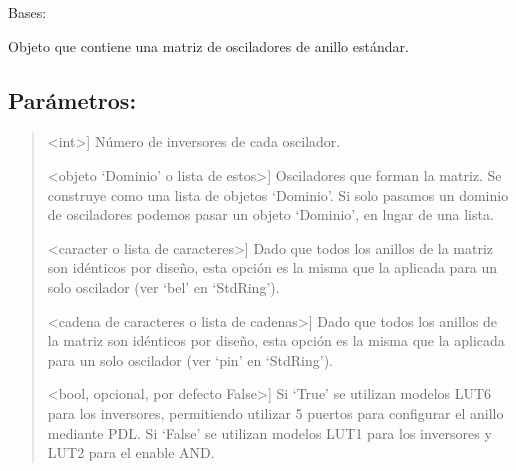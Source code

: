 \documentclass[letterpaper,10pt,english]{sphinxmanual}
\begin{document}
\begin{fulllineitems}
\label{\detokenize{myfpga:myfpga.ring_osc.StdMatrix}}
\pysigstartsignatures
{}
\pysigstopsignatures
\sphinxAtStartPar
Bases: 

\sphinxAtStartPar
Objeto que contiene una matriz de osciladores de anillo estándar.


\subsection{Parámetros:}
\label{\detokenize{myfpga:id3}}\begin{quote}
\begin{description}
\sphinxlineitem{N\_inv}{[}\textless{}int\textgreater{}{]}
\sphinxAtStartPar
Número de inversores de cada oscilador.

\sphinxlineitem{dominios}{[}\textless{}objeto ‘Dominio’ o lista de estos\textgreater{}{]}
\sphinxAtStartPar
Osciladores que forman la matriz. Se construye como una lista de 
objetos ‘Dominio’. Si solo pasamos un dominio de osciladores podemos
pasar un objeto ‘Dominio’, en lugar de una lista.

\sphinxlineitem{bel}{[}\textless{}caracter o lista de caracteres\textgreater{}{]}
\sphinxAtStartPar
Dado que todos los anillos de la matriz son idénticos 
por diseño, esta opción es la misma que la aplicada para
un solo oscilador (ver ‘bel’ en ‘StdRing’).

\sphinxlineitem{pin}{[}\textless{}cadena de caracteres o lista de cadenas\textgreater{}{]}
\sphinxAtStartPar
Dado que todos los anillos de la matriz son idénticos 
por diseño, esta opción es la misma que la aplicada para
un solo oscilador (ver ‘pin’ en ‘StdRing’).

\sphinxlineitem{pdl}{[}\textless{}bool, opcional, por defecto False\textgreater{}{]}
\sphinxAtStartPar
Si ‘True’ se utilizan modelos LUT6 para los inversores, permitiendo 
utilizar 5 puertos para configurar el anillo mediante PDL. Si ‘False’ 
se utilizan modelos LUT1 para los inversores y LUT2 para el enable AND.


\end{description}
\end{quote}
\end{fulllineitems}
\end{document}
